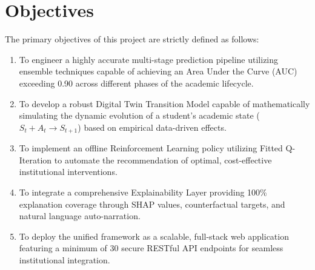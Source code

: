\documentclass[12pt,a4paper]{report}
\begin{document}
\section{Objectives}
The primary objectives of this project are strictly defined as follows:
\begin{enumerate}
    \item To engineer a highly accurate multi-stage prediction pipeline utilizing ensemble techniques capable of achieving an Area Under the Curve (AUC) exceeding 0.90 across different phases of the academic lifecycle.
    \item To develop a robust Digital Twin Transition Model capable of mathematically simulating the dynamic evolution of a student's academic state ($S_t + A_t \rightarrow S_{t+1}$) based on empirical data-driven effects.
    \item To implement an offline Reinforcement Learning policy utilizing Fitted Q-Iteration to automate the recommendation of optimal, cost-effective institutional interventions.
    \item To integrate a comprehensive Explainability Layer providing 100\% explanation coverage through SHAP values, counterfactual targets, and natural language auto-narration.
    \item To deploy the unified framework as a scalable, full-stack web application featuring a minimum of 30 secure RESTful API endpoints for seamless institutional integration.
\end{enumerate}
\end{document}

